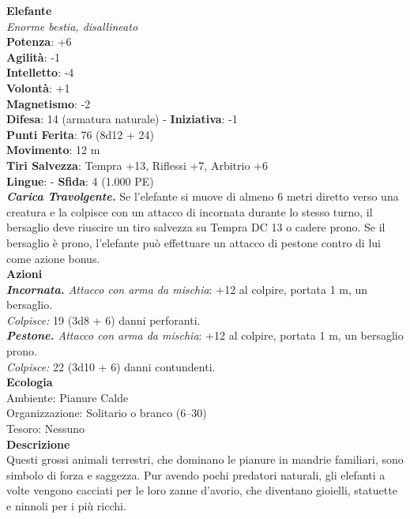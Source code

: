 \begin{multicols}{2}
\medskip\textbf{Elefante}\\
\emph{Enorme bestia, disallineato}\\
\textbf{Potenza}: +6\\
\textbf{Agilità}: -1\\
\textbf{Intelletto}: -4\\
\textbf{Volontà}: +1\\
\textbf{Magnetismo}: -2\\
\textbf{Difesa}: 14 (armatura naturale) - \textbf{Iniziativa}: -1\\
\textbf{Punti Ferita}: 76 (8d12 + 24)\\
\textbf{Movimento}: 12 m\\
\textbf{Tiri Salvezza}: Tempra +13, Riflessi +7, Arbitrio +6 \\
\textbf{Lingue}: -
\textbf{Sfida}: 4 (1.000 PE)\smallskip\\
\emph{\textbf{Carica Travolgente.}} Se l'elefante si muove di almeno 6 metri diretto verso una creatura e la colpisce con un attacco di incornata durante lo stesso turno, il bersaglio deve riuscire un tiro salvezza su Tempra DC  13 o cadere prono. Se il bersaglio è prono, l'elefante può effettuare un attacco di pestone contro di lui come azione bonus.\\
\smallskip\textbf{Azioni}\\
\emph{\textbf{Incornata.} Attacco con arma da mischia}: +12 al colpire, portata 1 m, un bersaglio.\\
\emph{Colpisce:} 19 (3d8 + 6) danni perforanti.\\
\emph{\textbf{Pestone.} Attacco con arma da mischia}: +12 al colpire, portata 1 m, un bersaglio prono.\\
\emph{Colpisce:} 22 (3d10 + 6) danni contundenti.\\
\textbf{Ecologia}\\
Ambiente: Pianure Calde\\
Organizzazione: Solitario o branco (6–30)\\
Tesoro: Nessuno\\
\textbf{Descrizione}\\

Questi grossi animali terrestri, che dominano le pianure in mandrie familiari, sono simbolo di forza e saggezza. Pur avendo pochi predatori naturali, gli elefanti a volte vengono cacciati per le loro zanne d’avorio, che diventano gioielli, statuette e ninnoli per i più ricchi. \\


\end{multicols}
